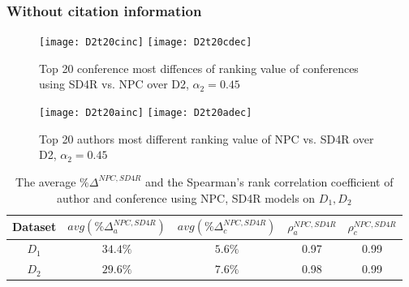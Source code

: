 \documentclass[10pt,leqno,twoside]{article}
\begin{document}
\subsubsection{Without citation information}
\begin{figure} %
	\caption{Top 20 conference most diffences of ranking value of conferences using SD4R vs. NPC over D2, $\alpha_2=0.45$}
	\label{Fig:Top20IncDecConference}
    \centering
    \texttt{[image: D2t20cinc]}
     \texttt{[image: D2t20cdec]}
\end{figure}
%
\begin{figure} %
	\caption{Top 20 authors most different ranking value of NPC vs. SD4R over D2, $\alpha_2=0.45$}
	\label{Fig:Top20IncDecAuthor}
    \centering
    \texttt{[image: D2t20ainc]}    
    \texttt{[image: D2t20adec]}
\end{figure}
%
\begin{table}
\begin{center}
\caption{The average $\%\Delta^{NPC,SD4R}$ and the Spearman's rank correlation coefficient of author and conference using NPC, SD4R models on $D_1, D_2$}
\label{tab:deltaresult}
{\scriptsize
\begin{tabular}{|c|c|c|c|c|}
\hline
Dataset	& $avg(\%\Delta^{NPC,SD4R}_a)$ & $avg(\%\Delta^{NPC,SD4R}_c)$ & $\rho^{NPC,SD4R}_a$ & $\rho^{NPC,SD4R}_c$ \\
\hline\hline
$D_1$ &	$34.4\%$ & $5.6\%$ & 0.97 & 0.99 \\
$D_2$ & $29.6\%$ & $7.6\%$ & 0.98 & 0.99 \\
\hline
\end{tabular}
}
\end{center}
\end{table}
%
%
\end{document}
